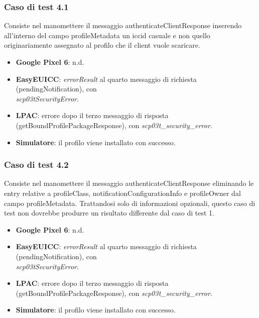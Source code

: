 \documentclass[10pt, oneside]{book}
\begin{document}
\subsubsection{Caso di test 4.1}
Consiste nel manomettere il messaggio authenticateClientResponse inserendo all'interno del campo profileMetadata un iccid casuale e non quello originariamente assegnato al profilo che il client vuole scaricare.
\begin{itemize}
\item \textbf{Google Pixel 6}: n.d.
\item \textbf{EasyEUICC}: \textit{errorResult} al quarto messaggio di richiesta (pendingNotification), con\\ \textit{scp03tSecurityError}.
\item \textbf{LPAC}: errore dopo il terzo messaggio di risposta (getBoundProfilePackageResponse), con \textit{scp03t\_security\_error}.
\item \textbf{Simulatore}: il profilo viene installato con successo.
\end{itemize}

\subsubsection{Caso di test 4.2}
Consiste nel manomettere il messaggio authenticateClientResponse eliminando le entry relative a profileClass, notificationConfigurationInfo e profileOwner dal campo profileMetadata. Trattandosi solo di informazioni opzionali, questo caso di test non dovrebbe produrre un risultato differente dal caso di test 1.
\begin{itemize}
\item \textbf{Google Pixel 6}: n.d.
\item \textbf{EasyEUICC}: \textit{errorResult} al quarto messaggio di richiesta (pendingNotification), con\\ \textit{scp03tSecurityError}.
\item \textbf{LPAC}: errore dopo il terzo messaggio di risposta (getBoundProfilePackageResponse), con \textit{scp03t\_security\_error}.
\item \textbf{Simulatore}: il profilo viene installato con successo.
\end{itemize}
\end{document}
